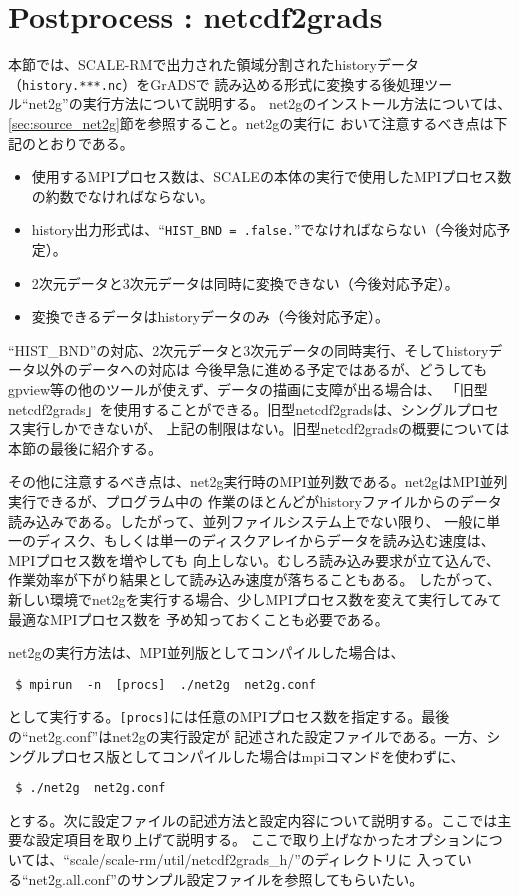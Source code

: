 \section{Postprocess : netcdf2grads}
\label{sec:net2g}

本節では、SCALE-RMで出力された領域分割されたhistoryデータ（\verb|history.***.nc|）をGrADSで
読み込める形式に変換する後処理ツール``net2g''の実行方法について説明する。
net2gのインストール方法については、\ref{sec:source_net2g}節を参照すること。net2gの実行に
おいて注意するべき点は下記のとおりである。

\begin{itemize}
 \item 使用するMPIプロセス数は、SCALEの本体の実行で使用したMPIプロセス数の約数でなければならない。
 \item history出力形式は、``\verb|HIST_BND = .false.|''でなければならない（今後対応予定）。
 \item 2次元データと3次元データは同時に変換できない（今後対応予定）。
 \item 変換できるデータはhistoryデータのみ（今後対応予定）。
\end{itemize}

``HIST\_BND''の対応、2次元データと3次元データの同時実行、そしてhistoryデータ以外のデータへの対応は
今後早急に進める予定ではあるが、どうしてもgpview等の他のツールが使えず、データの描画に支障が出る場合は、
「旧型netcdf2grads」を使用することができる。旧型netcdf2gradsは、シングルプロセス実行しかできないが、
上記の制限はない。旧型netcdf2gradsの概要については本節の最後に紹介する。

その他に注意するべき点は、net2g実行時のMPI並列数である。net2gはMPI並列実行できるが、プログラム中の
作業のほとんどがhistoryファイルからのデータ読み込みである。したがって、並列ファイルシステム上でない限り、
一般に単一のディスク、もしくは単一のディスクアレイからデータを読み込む速度は、MPIプロセス数を増やしても
向上しない。むしろ読み込み要求が立て込んで、作業効率が下がり結果として読み込み速度が落ちることもある。
したがって、新しい環境でnet2gを実行する場合、少しMPIプロセス数を変えて実行してみて最適なMPIプロセス数を
予め知っておくことも必要である。

net2gの実行方法は、MPI並列版としてコンパイルした場合は、
\begin{verbatim}
 $ mpirun  -n  [procs]  ./net2g  net2g.conf
\end{verbatim}
として実行する。\verb|[procs]|には任意のMPIプロセス数を指定する。最後の``net2g.conf''はnet2gの実行設定が
記述された設定ファイルである。一方、シングルプロセス版としてコンパイルした場合はmpiコマンドを使わずに、
\begin{verbatim}
 $ ./net2g  net2g.conf
\end{verbatim}
とする。次に設定ファイルの記述方法と設定内容について説明する。ここでは主要な設定項目を取り上げて説明する。
ここで取り上げなかったオプションについては、``scale/scale-rm/util/netcdf2grads\_h/''のディレクトリに
入っている``net2g.all.conf''のサンプル設定ファイルを参照してもらいたい。

